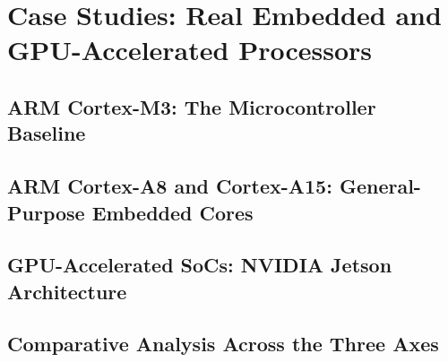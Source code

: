 \chapter{Case Studies: Real Embedded and GPU-Accelerated Processors}
\label{ch:case-studies}


\section{ARM Cortex-M3: The Microcontroller Baseline}

\section{ARM Cortex-A8 and Cortex-A15: General-Purpose Embedded Cores}

\section{GPU-Accelerated SoCs: NVIDIA Jetson Architecture}

\section{Comparative Analysis Across the Three Axes}
